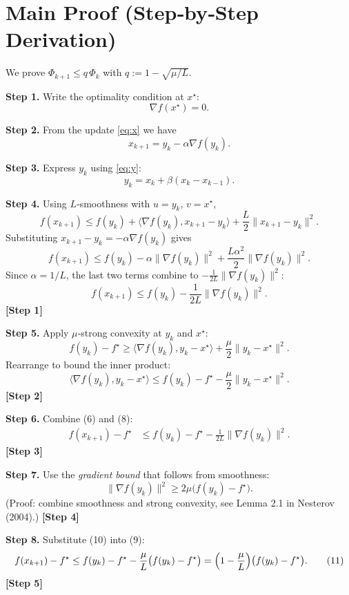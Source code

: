 \documentclass{article}
\newcommand{\grad}{\nabla}
\begin{document}
\section*{Main Proof (Step‑by‑Step Derivation)}
We prove $\Phi_{k+1}\le q\,\Phi_k$ with $q:=1-\sqrt{\mu/L}$.

\noindent\textbf{Step 1.}  Write the optimality condition at $x^\star$:
\[
\grad f(x^\star)=0 .
\tag{1}
\]

\noindent\textbf{Step 2.}  From the update \eqref{eq:x} we have
\[
x_{k+1}=y_k-\alpha\grad f(y_k).
\tag{2}
\]

\noindent\textbf{Step 3.}  Express $y_k$ using \eqref{eq:y}:
\[
y_k = x_k + \beta (x_k-x_{k-1}).
\tag{3}
\]

\noindent\textbf{Step 4.}  Using $L$‑smoothness with $u=y_k$, $v=x^\star$,
\[
f(x_{k+1}) \le f(y_k) + \langle\grad f(y_k),x_{k+1}-y_k\rangle
               +\frac{L}{2}\|x_{k+1}-y_k\|^2 .
\tag{4}
\]
Substituting $x_{k+1}-y_k = -\alpha\grad f(y_k)$ gives
\[
f(x_{k+1}) \le f(y_k) -\alpha\|\grad f(y_k)\|^2
               +\frac{L\alpha^{2}}{2}\|\grad f(y_k)\|^2 .
\tag{5}
\]
Since $\alpha=1/L$, the last two terms combine to $-\frac{1}{2L}\|\grad f(y_k)\|^2$:
\[
f(x_{k+1}) \le f(y_k) -\frac{1}{2L}\|\grad f(y_k)\|^2 .
\tag{6}
\]
\textbf{[Step 1]}

\noindent\textbf{Step 5.}  Apply $\mu$‑strong convexity at $y_k$ and $x^\star$:
\[
f(y_k)-f^\star \ge \langle\grad f(y_k),y_k-x^\star\rangle +\frac{\mu}{2}\|y_k-x^\star\|^2 .
\tag{7}
\]
Rearrange to bound the inner product:
\[
\langle\grad f(y_k),y_k-x^\star\rangle \le
f(y_k)-f^\star -\frac{\mu}{2}\|y_k-x^\star\|^2 .
\tag{8}
\]
\textbf{[Step 2]}

\noindent\textbf{Step 6.}  Combine (6) and (8):
\[
\begin{aligned}
f(x_{k+1})-f^\star
&\le f(y_k)-f^\star 
   -\frac{1}{2L}\|\grad f(y_k)\|^2 .
\end{aligned}
\tag{9}
\]
\textbf{[Step 3]}

\noindent\textbf{Step 7.}  Use the \emph{gradient bound} that follows from smoothness:
\[
\|\grad f(y_k)\|^2 \ge 2\mu\bigl(f(y_k)-f^\star\bigr) .
\tag{10}
\]
(Proof: combine smoothness and strong convexity, see Lemma 2.1 in Nesterov (2004).)
\textbf{[Step 4]}

\noindent\textbf{Step 8.}  Substitute (10) into (9):
\[
f(x_{k+1})-f^\star
\le f(y_k)-f^\star -\frac{\mu}{L}\bigl(f(y_k)-f^\star\bigr)
= \Bigl(1-\frac{\mu}{L}\Bigr)\bigl(f(y_k)-f^\star\bigr).
\tag{11}
\]
\textbf{[Step 5]}
\end{document}
